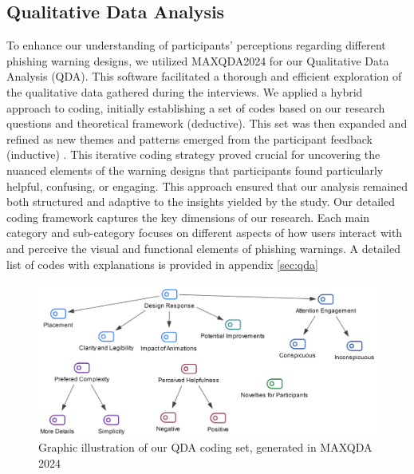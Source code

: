 \documentclass[
  a4paper,  %
  twoside,  %
  bibliography=totoc,
  headsepline,
  cleardoublepage=empty,
  parskip=half,
  draft=false
]{scrbook}
\begin{document}
\subsection{Qualitative Data Analysis}
To enhance our understanding of participants' perceptions regarding different phishing warning designs, we utilized MAXQDA2024 for our Qualitative Data Analysis (QDA). This software facilitated a thorough and efficient exploration of the qualitative data gathered during the interviews. \newline
We applied a hybrid approach to coding, initially establishing a set of codes based on our research questions and theoretical framework (deductive). This set was then expanded and refined as new themes and patterns emerged from the participant feedback (inductive) \cite{qda}. This iterative coding strategy proved crucial for uncovering the nuanced elements of the warning designs that participants found particularly helpful, confusing, or engaging. This approach ensured that our analysis remained both structured and adaptive to the insights yielded by the study. \newline
Our detailed coding framework captures the key dimensions of our research. Each main category and sub-category focuses on different aspects of how users interact with and perceive the visual and functional elements of phishing warnings. A detailed list of codes with explanations is provided in appendix \ref{sec:qda}

\begin{figure} [ht]
    \centering
    \includegraphics[width=1\linewidth]{figures/coding.png}
    \caption{Graphic illustration of our QDA coding set, generated in MAXQDA 2024}
    \label{fig:qda}
\end{figure}
\end{document}
